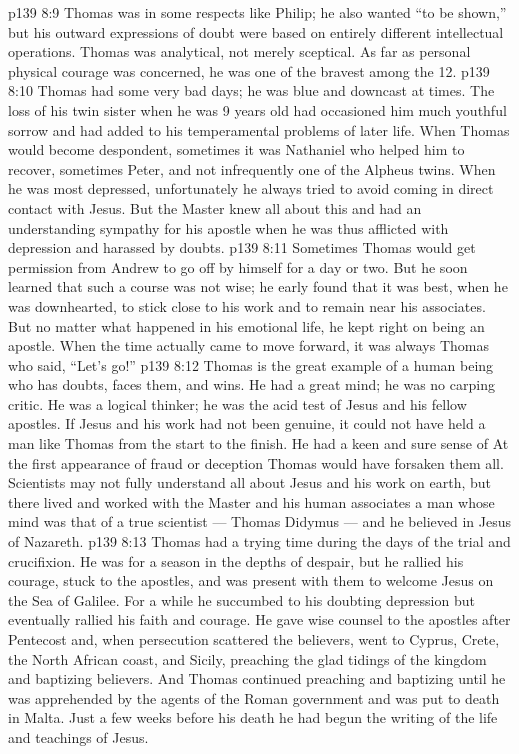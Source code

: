 \vs p139 8:9 Thomas was in some respects like Philip; he also wanted “to be shown,” but his outward expressions of doubt were based on entirely different intellectual operations. Thomas was analytical, not merely sceptical. As far as personal physical courage was concerned, he was one of the bravest among the 12.
\vs p139 8:10 \pc Thomas had some very bad days; he was blue and downcast at times. The loss of his twin sister when he was 9 years old had occasioned him much youthful sorrow and had added to his temperamental problems of later life. When Thomas would become despondent, sometimes it was Nathaniel who helped him to recover, sometimes Peter, and not infrequently one of the Alpheus twins. When he was most depressed, unfortunately he always tried to avoid coming in direct contact with Jesus. But the Master knew all about this and had an understanding sympathy for his apostle when he was thus afflicted with depression and harassed by doubts.
\vs p139 8:11 Sometimes Thomas would get permission from Andrew to go off by himself for a day or two. But he soon learned that such a course was not wise; he early found that it was best, when he was downhearted, to stick close to his work and to remain near his associates. But no matter what happened in his emotional life, he kept right on being an apostle. When the time actually came to move forward, it was always Thomas who said, “Let’s go!”
\vs p139 8:12 Thomas is the great example of a human being who has doubts, faces them, and wins. He had a great mind; he was no carping critic. He was a logical thinker; he was the acid test of Jesus and his fellow apostles. If Jesus and his work had not been genuine, it could not have held a man like Thomas from the start to the finish. He had a keen and sure sense of  At the first appearance of fraud or deception Thomas would have forsaken them all. Scientists may not fully understand all about Jesus and his work on earth, but there lived and worked with the Master and his human associates a man whose mind was that of a true scientist --- Thomas Didymus --- and he believed in Jesus of Nazareth.
\vs p139 8:13 \pc Thomas had a trying time during the days of the trial and crucifixion. He was for a season in the depths of despair, but he rallied his courage, stuck to the apostles, and was present with them to welcome Jesus on the Sea of Galilee. For a while he succumbed to his doubting depression but eventually rallied his faith and courage. He gave wise counsel to the apostles after Pentecost and, when persecution scattered the believers, went to Cyprus, Crete, the North African coast, and Sicily, preaching the glad tidings of the kingdom and baptizing believers. And Thomas continued preaching and baptizing until he was apprehended by the agents of the Roman government and was put to death in Malta. Just a few weeks before his death he had begun the writing of the life and teachings of Jesus.
